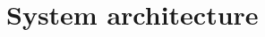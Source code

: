 \section{System architecture}
\begin{comment}
	The most overall, top level description of your application. If your application
	uses multiple components (such as servers, databases, etc.), describe their
	responsibilities here and show how they are dependent on each other and how they
	communicate (which protocols etc.)

	You will to describe the `flow' of the application at a high level. What happens
	if the application is started (and later stopped) and what the normal flow of
	operation is. Relate this to the different components (if any) in your
	application.
\end{comment}